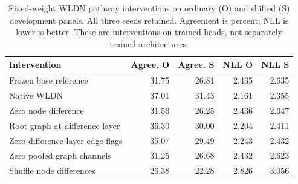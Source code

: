 \begin{table}[ht]
\centering\small
\caption{Fixed-weight WLDN pathway interventions on ordinary (O) and shifted (S) development panels. All three seeds retained. Agreement is percent; NLL is lower-is-better. These are interventions on trained heads, not separately trained architectures.\label{tab:wldn-interventions}}
\begin{tabular}{lrrrr}
\toprule
Intervention & Agree. O & Agree. S & NLL O & NLL S \\
\midrule
Frozen base reference & 31.75 & 26.81 & 2.435 & 2.635 \\
Native WLDN & 37.01 & 31.43 & 2.161 & 2.355 \\
Zero node difference & 31.56 & 26.25 & 2.436 & 2.647 \\
Root graph at difference layer & 36.30 & 30.00 & 2.204 & 2.411 \\
Zero difference-layer edge flags & 35.07 & 29.49 & 2.243 & 2.432 \\
Zero pooled graph channels & 31.25 & 26.68 & 2.432 & 2.623 \\
Shuffle node differences & 26.38 & 22.28 & 2.826 & 3.056 \\
\bottomrule
\end{tabular}
\end{table}
